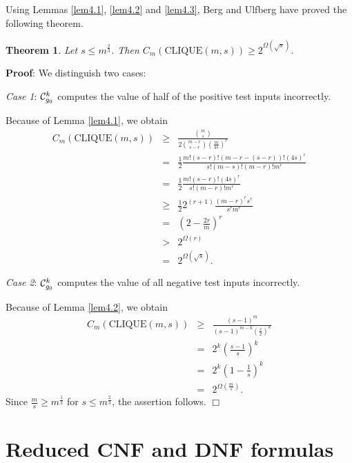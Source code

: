 \documentclass[11pt]{article}
\newtheorem{theo}{Theorem}
\begin{document}
Using Lemmas \ref{lem4.1}, \ref{lem4.2} and \ref{lem4.3}, Berg and Ulfberg \cite{BeUl} have proved the
following theorem.

\begin{theo}
  Let $s \leq m^{\frac{2}{3}}$. Then $C_m(\mbox{CLIQUE}(m,s)) \geq 2^{\Omega(\sqrt{s})}$.
\end{theo}
{\bf Proof}:
We distinguish two cases:

\smallskip
\noindent
{\em Case 1\/}: ${\cal C}_{g_0}^k$ computes the value of half of the positive test inputs incorrectly.

\smallskip
Because of Lemma \ref{lem4.1}, we obtain
$$
\begin{array}{lll}
  C_m(\mbox{CLIQUE}(m,s)) & \geq & \frac{{m \choose s}}{2{m-r \choose s-r}(\frac{m}{4s})^r} \\
                     & = & \frac{1}{2} \frac{m!(s-r)!(m-r-(s-r))!(4s)^r}{s!(m-s)!(m-r)!m^r} \\
                     & = & \frac{1}{2} \frac{m!(s-r)!(4s)^r}{s!(m-r)!m^r} \\
                     & \geq & \frac{1}{2} 2^{(r+1)} \frac{(m-r)^rs^r}{s^r m^r} \\
                     & = & (2 - \frac{2r}{m})^r \\
                     & > & 2^{\Omega(r)} \\
                     & = & 2^{\Omega(\sqrt{s})}.
\end{array}
$$

\medskip
\noindent
{\em Case 2\/}: ${\cal C}_{g_0}^k$ computes the value of all negative test inputs incorrectly.

\smallskip
Because of Lemma \ref{lem4.2}, we obtain
$$
\begin{array}{lll}
  C_m(\mbox{CLIQUE}(m,s)) & \geq & \frac{(s-1)^m}{(s-1)^{m-k}(\frac{s}{2})^k} \\
                      & = & 2^k(\frac{s-1}{s})^k  \\
                      & = & 2^k(1 - \frac{1}{s})^k  \\
                      & = & 2^{\Omega(\frac{m}{s})}.
\end{array}
$$
Since $\frac{m}{s} \geq m^{\frac{1}{3}}$ for $s \leq m^{\frac{2}{3}}$, the assertion follows.
$\Box$

\section{Reduced CNF and DNF formulas}
\end{document}
